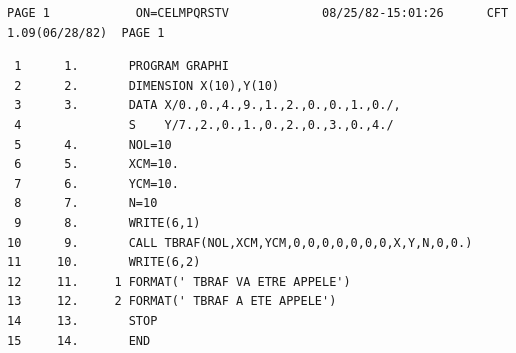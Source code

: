 
{\fontsize{5}{6}\selectfont
\begin{verbatim}
PAGE 1            ON=CELMPQRSTV             08/25/82-15:01:26      CFT 1.09(06/28/82)  PAGE 1
\end{verbatim}
}

{\footnotesize
\begin{verbatim}
 1      1.       PROGRAM GRAPHI
 2      2.       DIMENSION X(10),Y(10)
 3      3.       DATA X/0.,0.,4.,9.,1.,2.,0.,0.,1.,0./,
 4               S    Y/7.,2.,0.,1.,0.,2.,0.,3.,0.,4./
 5      4.       NOL=10
 6      5.       XCM=10.
 7      6.       YCM=10.
 8      7.       N=10
 9      8.       WRITE(6,1)
10      9.       CALL TBRAF(NOL,XCM,YCM,0,0,0,0,0,0,0,X,Y,N,0,0.)
11     10.       WRITE(6,2)
12     11.     1 FORMAT(' TBRAF VA ETRE APPELE')
13     12.     2 FORMAT(' TBRAF A ETE APPELE')
14     13.       STOP
15     14.       END
\end{verbatim}
}

